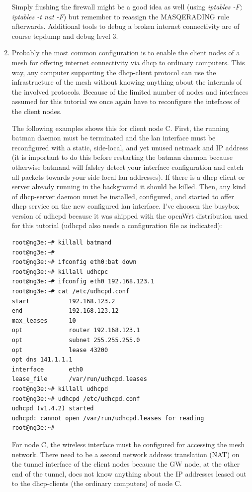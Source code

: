 \documentclass[11pt]{article}
\begin{document}
\begin{enumerate}
Simply flushing the firewall might be a good idea as well (using \emph{iptables -F; iptables -t nat -F}) but remember to reassign the MASQERADING rule afterwards.
Additional tools to debug a broken internet connectivity are of course tcpdump and debug level 3.


\item Probably the most common configuration is to enable the client nodes of a mesh for offering internet connectivity via dhcp to ordinary computers.
%
This way, any computer supporting the dhcp-client protocol can use the infrastructure of the mesh without knowing anything about the internals of the involved protocols.
%
Because of the limited number of nodes and interfaces assumed for this tutorial we once again have to reconfigure the intefaces of the client nodes.
%

The following examples shows this for client node C.
%
First, the running batman daemon must be terminated and the lan interface must be reconfigured with a static, side-local, and yet unused netmask and IP address
(it is important to do this before restarting the batman daemon because otherwise batmand will falsley detect your interface configuration and catch all packets towards your side-local lan addresses).
%
If there is a dhcp client or server already running in the background it should be killed.
Then, any kind of dhcp-server daemon must be installed, configured, and started to offer dhcp service on the new configured lan interface. I've choosen the busybox version of udhcpd because it was shipped with the openWrt distribution used for this tutorial (udhcpd also needs a configuration file as indicated):
\begin{small} \begin{verbatim}
root@ng3e:~# killall batmand
root@ng3e:~# 
root@ng3e:~# ifconfig eth0:bat down
root@ng3e:~# killall udhcpc
root@ng3e:~# ifconfig eth0 192.168.123.1
root@ng3e:~# cat /etc/udhcpd.conf
start           192.168.123.2
end             192.168.123.12
max_leases      10
opt             router 192.168.123.1
opt             subnet 255.255.255.0
opt             lease 43200
opt dns 141.1.1.1
interface       eth0
lease_file      /var/run/udhcpd.leases
root@ng3e:~# killall udhcpd
root@ng3e:~# udhcpd /etc/udhcpd.conf
udhcpd (v1.4.2) started
udhcpd: cannot open /var/run/udhcpd.leases for reading
root@ng3e:~#  
\end{verbatim} \end{small}

For node C, the wireless interface must be configured for accessing the mesh network.
%
There need to be a second network address translation (NAT) on the tunnel interface of the client nodes because the GW node, at the other end of the tunnel, does not know anything about the IP addresses leased out to the dhcp-clients (the ordinary computers) of node C. 


\end{enumerate}
\end{document}
